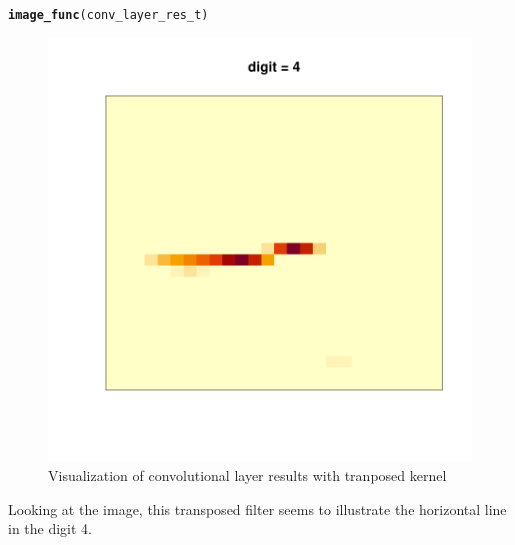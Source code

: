 \documentclass[10pt, a4paper, english]{article}\usepackage[]{graphicx}\usepackage[dvipsnames]{xcolor}
\makeatletter
\def\maxwidth{ %
  \ifdim\Gin@nat@width>\linewidth
    \linewidth
  \else
    \Gin@nat@width
  \fi
}
\newcommand{\hlstd}[1]{\textcolor[rgb]{0.345,0.345,0.345}{#1}}%
\newcommand{\hlkwd}[1]{\textcolor[rgb]{0.737,0.353,0.396}{\textbf{#1}}}%
\newenvironment{kframe}{%
 \def\at@end@of@kframe{}%
 \ifinner\ifhmode%
  \def\at@end@of@kframe{\end{minipage}}%
  \begin{minipage}{\columnwidth}%
 \fi\fi%
 \def\FrameCommand##1{\hskip\@totalleftmargin \hskip-\fboxsep
 \colorbox{shadecolor}{##1}\hskip-\fboxsep
     \hskip-\linewidth \hskip-\@totalleftmargin \hskip\columnwidth}%
 \MakeFramed {\advance\hsize-\width
   \@totalleftmargin\z@ \linewidth\hsize
   \@setminipage}}%
 {\par\unskip\endMakeFramed%
 \at@end@of@kframe}
\newenvironment{knitrout}{}{} %
\makeatother
\begin{document}
\begin{knitrout}
\color{fgcolor}\begin{kframe}
\begin{alltt}
\hlkwd{image_func}\hlstd{(conv_layer_res_t)}
\end{alltt}
\end{kframe}\begin{figure}
\includegraphics[width=\maxwidth]{figure/unnamed-chunk-40-1} \caption[Visualization of convolutional layer results with tranposed kernel ]{Visualization of convolutional layer results with tranposed kernel }\label{fig:unnamed-chunk-40}
\end{figure}

\end{knitrout}

Looking at the image, this transposed filter seems to illustrate the horizontal line in the digit 4. 
\end{document}

